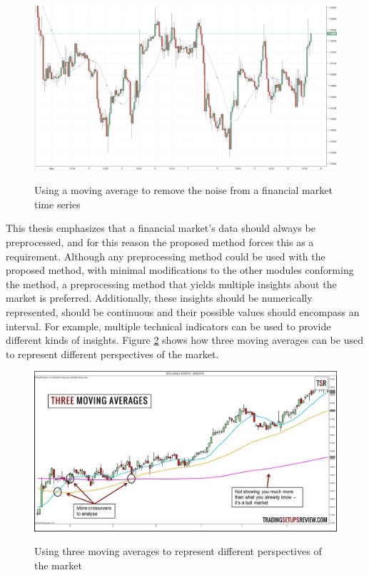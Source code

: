 \begin{figure}
\caption{Using a moving average to remove the noise from a financial market time
  series} \centering
\includegraphics[width=1.0\textwidth]{img/moving-average.png}
\label{figure:moving-average-noise}
\end{figure}

This thesis emphasizes that a financial market's data should always be
preprocessed, and for this reason the proposed method forces this as a
requirement. Although any preprocessing method could be used with the proposed
method, with minimal modifications to the other modules conforming the method, a
preprocessing method that yields multiple insights about the market is
preferred. Additionally, these insights should be numerically represented,
should be continuous and their possible values should encompass an interval. For
example, multiple technical indicators can be used to provide different kinds of
insights. Figure \ref{figure:multiple-technical-indicators} shows how three
moving averages can be used to represent different perspectives of the market.

\begin{figure}
\caption{Using three moving averages to represent different perspectives of the
  market} \centering
\includegraphics[width=1.0\textwidth]{img/multiple-technical-indicators.jpg}
\label{figure:multiple-technical-indicators}
\end{figure}

